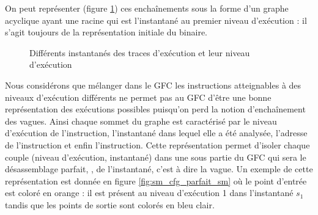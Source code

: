 On peut représenter (figure \ref{fig:arbre_vagues}) ces enchaînements sous la forme d'un graphe acyclique ayant une racine qui est l'instantané au premier niveau d'exécution : il s'agit toujours de la représentation initiale du binaire.

\begin{figure}[h]
\begin{center}
\end{center}
\caption{Différents instantanés des traces d'exécution et leur niveau d'exécution}
\label{fig:arbre_vagues}
\end{figure}

Nous considérons que mélanger dans le GFC les instructions atteignables à des niveaux d'exécution différents ne permet pas au GFC d'être une bonne représentation des exécutions possibles puisqu'on perd la notion d'enchaînement des vagues.
Ainsi chaque sommet du graphe est caractérisé par le niveau d'exécution de l'instruction, l'instantané dans lequel elle a été analysée, l'adresse de l'instruction et enfin l'instruction.
Cette représentation permet d'isoler chaque couple (niveau d'exécution, instantané) dans une sous partie du GFC qui sera le désassemblage parfait, \nsm, de l'instantané, c'est à dire la vague.
Un exemple de cette représentation est donnée en figure \ref{fig:sm_cfg_parfait_sm} où le point d'entrée est coloré en orange : il est présent au niveau d'exécution 1 dans l'instantané $s_1$ tandis que les points de sortie sont colorés en bleu clair.

